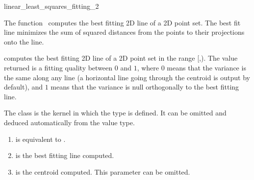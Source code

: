 
\begin{ccRefFunction}{linear_least_squares_fitting_2}  


\ccDefinition
  
The function \ccRefName\ computes the best fitting 2D line of a 2D
point set. The best fit line minimizes the sum of squared distances
from the points to their projections onto the line.


{ computes the best fitting 2D line of a 2D point set in the range
[,). The value returned is a fitting quality
between $0$ and $1$, where $0$ means that the variance is the same
along any line (a horizontal line going through the centroid is output
by default), and $1$ means that the variance is null orthogonally
to the best fitting line. }

The class  is the kernel in which the type
 is defined. It can be omitted and
deduced automatically from the value type.


\begin{enumerate}
   \item  {} is equivalent to .
   \item  {} is the best fitting line computed.
   \item  {} is the centroid computed. This parameter can be
          omitted.
\end{enumerate}

\end{ccRefFunction}
